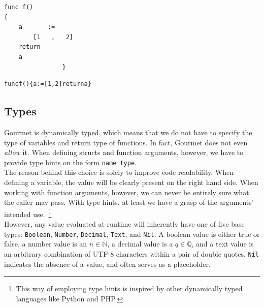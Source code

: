 \begin{lstlisting}[caption={A Gourmet program with a lot of whitespace.}, captionpos=b, label={f with a lot of whitespace.}]
func f()
{
    a       :=
        [1   ,   2]
    return
    a
                }
\end{lstlisting}

\begin{lstlisting}[caption={A Gourmet program with no whitespace.}, captionpos=b, label={f with no whitespace.}]
funcf(){a:=[1,2]returna}
\end{lstlisting}


\subsection{Types}

Gourmet is dynamically typed, which means that we do not have to specify the type of variables and return type of functions. In fact, Gourmet does not even \textit{allow} it. When defining structs and function arguments, however, we have to provide type hints on the form \texttt{name type}. \\

The reason behind this choice is solely to improve code readability. When defining a variable, the value will be clearly present on the right hand side. When working with function arguments, however, we can never be entirely sure what the caller may pass. With type hints, at least we have a grasp of the arguments' intended use.~\footnote{This way of employing type hints is inspired by other dynamically typed languages like Python and PHP.} \\

However, any value evaluated at runtime will inherently have one of five base types:  \texttt{Boolean}, \texttt{Number}, \texttt{Decimal}, \texttt{Text}, and \texttt{Nil}. A boolean value is either true or false, a number value is an  $n \in \mathbb{N}$, a decimal value is a $q \in \mathbb{Q}$, and a text value is an arbitrary combination of UTF-8 characters within a pair of double quotes. \texttt{Nil} indicates the absence of a value, and often serves as a placeholder. \\

